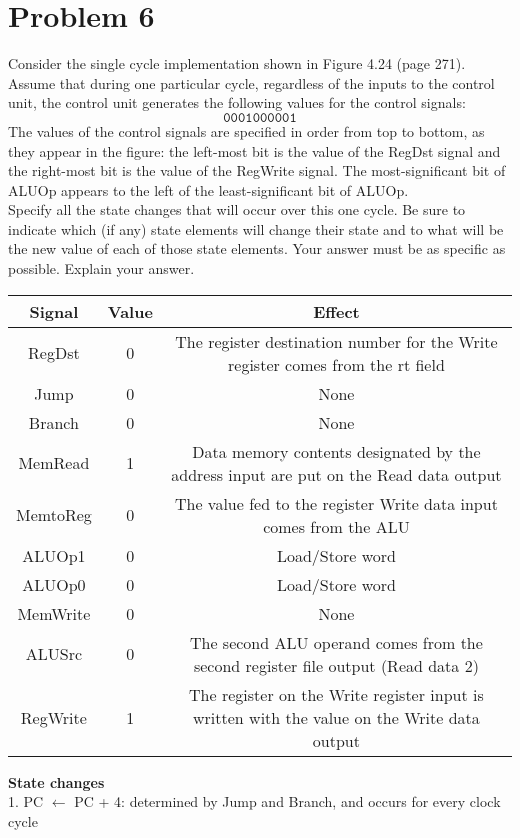 \documentclass[10pt,letterpaper]{article}
\begin{document}
\section{Problem 6}
Consider the single cycle implementation shown in Figure 4.24 (page 271). Assume that during one particular cycle, regardless of the inputs to the control unit, the control unit generates the following values for the control signals:
\[\texttt{0001000001}\]
The values of the control signals are specified in order from top to bottom, as they appear in the figure: the left-most bit is the value of the RegDst signal and the right-most bit is the value of the RegWrite signal. The most-significant bit of ALUOp appears to the left of the least-significant bit of ALUOp.\\
Specify all the state changes that will occur over this one cycle. Be sure to indicate which (if any) state elements will change their state and to what will be the new value of each of those state elements. Your answer must be as specific as possible. Explain your answer.
\begin{center}
\begin{tabular} { |c|c|c| }
\hline 
\textbf{Signal} & \textbf{Value} & \textbf{Effect} \\
\hline
RegDst & 0 & The register destination number for the Write register comes from the rt field \\
\hline
Jump & 0 & None \\
\hline
Branch & 0 & None \\
\hline
MemRead & 1 & Data memory contents designated by the address input are put on the Read data output\\
\hline
MemtoReg & 0 & The value fed to the register Write data input comes from the ALU \\
\hline
ALUOp1 & 0 & Load/Store word \\
\hline
ALUOp0 & 0 & Load/Store word \\
\hline
MemWrite & 0 & None \\
\hline
ALUSrc & 0 & The second ALU operand comes from the second register file output (Read data 2)\\
\hline
RegWrite & 1 & The register on the Write register input is written with the value on the Write data output\\
\hline
\end{tabular}
\end{center}
\textbf{State changes}\\
1. PC $\leftarrow$ PC + 4: determined by Jump and Branch, and occurs for every clock cycle \\
\end{document}
